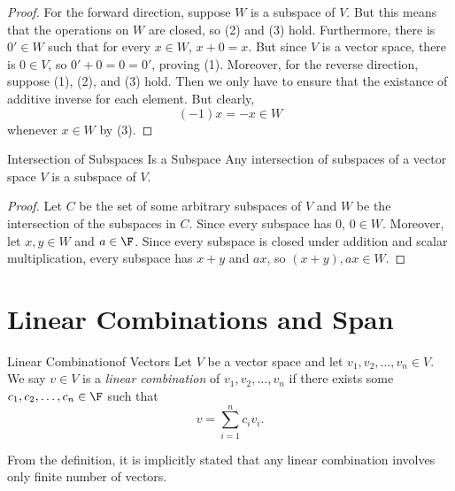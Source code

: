 \documentclass[linearalgebra]{subfiles}
\begin{document}
    \begin{proof}
        For the forward direction, suppose $W$ is a subspace of $V$. But this means that the operations on $W$ are closed, so (2) and (3) hold. Furthermore, there is $0'\in W$ such that for every $x\in W$, $x+0 = x$. But since $V$ is a vector space, there is $0\in V$, so $0'+0 = 0 = 0'$, proving (1). Moreover, for the reverse direction, suppose (1), (2), and (3) hold. Then we only have to ensure that the existance of additive inverse for each element. But clearly,
        \begin{equation*}
            (-1)x = -x\in W
        \end{equation*}
        whenever $x\in W$ by (3).
    \end{proof}

    \begin{prop}{Intersection of Subspaces Is a Subspace}
        Any intersection of subspaces of a vector space $V$ is a subspace of $V$.
    \end{prop}

    \begin{proof}
        Let $C$ be the set of some arbitrary subspaces of $V$ and $W$ be the intersection of the subspaces in $C$. Since every subspace has $0$, $0\in W$. Moreover, let $x, y\in W$ and $a\in \F$. Since every subspace is closed under addition and scalar multiplication, every subspace has $x+y$ and $ax$, so $(x+y), ax\in W$.
    \end{proof}

    \section{Linear Combinations and Span}

    \begin{definition}{Linear Combination}{of Vectors}
        Let $V$ be a vector space and let $v_1,v_2,\ldots,v_n\in V$. We say $v\in V$ is a \emph{linear combination} of $v_1,v_2,\ldots,v_n$ if there exists some $c_1,c_2,\ldots,c_n\in\F$ such that
        \begin{equation*}
            v = \sum^{n}_{i=1} c_iv_i.
        \end{equation*}
    \end{definition}

    \begin{remark}
        From the definition, it is implicitly stated that any linear combination involves only finite number of vectors.
    \end{remark}
\end{document}
